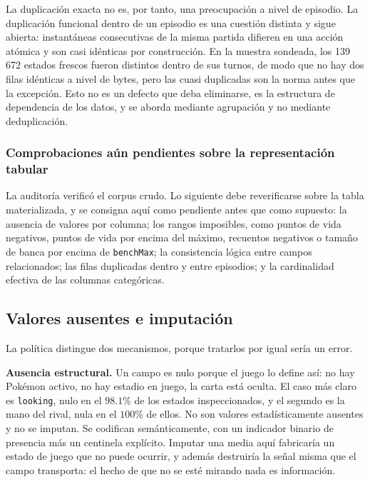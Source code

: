 \documentclass[conference]{IEEEtran}
\newcommand{\code}[1]{\texttt{#1}}
\begin{document}
La duplicaci\'on exacta no es, por tanto, una preocupaci\'on a nivel de
episodio. La duplicaci\'on funcional dentro de un episodio es una cuesti\'on
distinta y sigue abierta: instant\'aneas consecutivas de la misma partida
difieren en una acci\'on at\'omica y son casi id\'enticas por
construcci\'on. En la muestra sondeada, los 139\,672 estados frescos fueron
distintos dentro de sus turnos, de modo que no hay dos filas id\'enticas a
nivel de bytes, pero las cuasi duplicadas son la norma antes que la
excepci\'on. Esto no es un defecto que deba eliminarse, es la estructura
de dependencia de los datos, y se aborda mediante agrupaci\'on y no mediante
deduplicaci\'on.

\subsubsection{Comprobaciones a\'un pendientes sobre la representaci\'on tabular}
La auditor\'ia verific\'o el corpus crudo. Lo siguiente debe reverificarse
sobre la tabla materializada, y se consigna aqu\'i como pendiente antes que
como supuesto: la ausencia de valores por columna; los rangos imposibles,
como puntos de vida negativos, puntos de vida por encima del m\'aximo,
recuentos negativos o tama\~no de banca por encima de \code{benchMax}; la
consistencia l\'ogica entre campos relacionados; las filas duplicadas dentro
y entre episodios; y la cardinalidad efectiva de las columnas categ\'oricas.

\subsection{Valores ausentes e imputaci\'on}
\label{subsec:imputation}

La pol\'itica distingue dos mecanismos, porque tratarlos por igual ser\'ia
un error.

\textbf{Ausencia estructural.} Un campo es nulo porque el juego lo define
as\'i: no hay Pok\'emon activo, no hay estadio en juego, la carta est\'a
oculta. El caso m\'as claro es \code{looking}, nulo en el $98.1\%$ de los
estados inspeccionados, y el segundo es la mano del rival, nula en el
$100\%$ de ellos. No son valores estad\'isticamente ausentes y no se
imputan. Se codifican sem\'anticamente, con un indicador binario de presencia
m\'as un centinela expl\'icito. Imputar una media aqu\'i fabricar\'ia un
estado de juego que no puede ocurrir, y adem\'as destruir\'ia la se\~nal
misma que el campo transporta: el hecho de que no se est\'e mirando nada es
informaci\'on.
\end{document}

